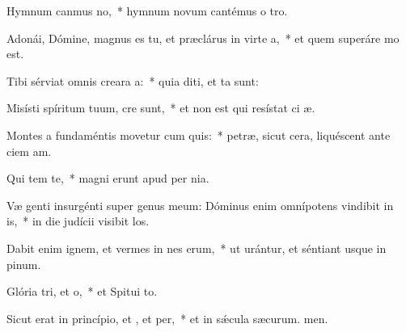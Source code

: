 \item Hymnum canmus no,~* hymnum novum cantémus o tro.
\item Adonái, Dómine, magnus es tu, et præclárus in virte a,~* et quem superáre mo est.
\item Tibi sérviat omnis creara a:~* quia diti, et ta sunt:
\item Misísti spíritum tuum,  cre sunt,~* et non est qui resístat ci æ.
\item Montes a fundaméntis movetur cum quis:~* petræ, sicut cera, liquéscent ante ciem am.
\item Qui tem  te,~* magni erunt apud  per nia.
\item Væ genti insurgénti super genus meum: Dóminus enim omnípotens vindibit in is,~* in die judícii visibit los.
\item Dabit enim ignem, et vermes in nes erum,~* ut urántur, et séntiant usque in pinum.
\item Glória tri, et o,~* et Spitui to.
\item Sicut erat in princípio, et , et per,~* et in sǽcula sæcurum. men.
